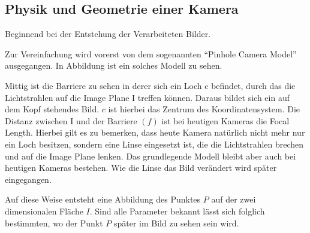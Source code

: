 \subsection{Physik und Geometrie einer Kamera}
Beginnend bei der Entstehung der Verarbeiteten Bilder. 

Zur Vereinfachung wird vorerst von dem sogenannten "`Pinhole Camera Model"' ausgegangen. In Abbildung  ist ein solches Modell zu sehen. 

Mittig ist die Barriere zu sehen in derer sich ein Loch c befindet, durch das die Lichtstrahlen auf die Image Plane I treffen können. Daraus bildet sich ein auf dem Kopf stehendes Bild. $c$ ist hierbei das Zentrum des Koordinatensystem.
Die Distanz zwischen I und der Barriere $(f)$ ist bei heutigen Kameras die Focal Length. Hierbei gilt es zu bemerken, dass heute Kamera natürlich nicht mehr nur ein Loch besitzen, sondern eine Linse eingesetzt ist, die die Lichtstrahlen brechen und auf die Image Plane lenken. Das grundlegende Modell bleibt aber auch bei heutigen Kameras bestehen. Wie die Linse das Bild verändert wird später eingegangen. 

Auf diese Weise entsteht eine Abbildung des Punktes $P$ auf der zwei dimensionalen Fläche $I$. Sind alle Parameter bekannt lässt sich folglich bestimmten, wo der Punkt $P$ später im Bild zu sehen sein wird. 

